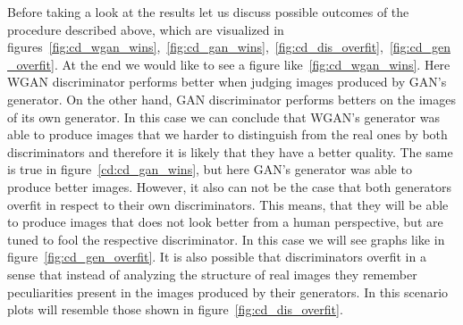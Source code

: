 Before taking a look at the results let us discuss possible outcomes of the procedure described above, which are visualized in figures~\ref{fig:cd_wgan_wins},~\ref{fig:cd_gan_wins},~\ref{fig:cd_dis_overfit},~\ref{fig:cd_gen_overfit}. At the end we would like to see a figure like~\ref{fig:cd_wgan_wins}. Here WGAN discriminator performs better when judging images produced by GAN's generator. On the other hand, GAN discriminator performs betters on the images of its own generator. In this case we can conclude that WGAN's generator was able to produce images that we harder to distinguish from the real ones by both discriminators and therefore it is likely that they have a better quality. The same is true in figure~\ref{cd:cd_gan_wins}, but here GAN's generator was able to produce better images. However, it also can not be the case that both generators overfit in respect to their own discriminators. This means, that they will be able to produce images that does not look better from a human perspective, but are tuned to fool the respective discriminator. In this case we will see graphs like in figure~\ref{fig:cd_gen_overfit}. It is also possible that discriminators overfit in a sense that instead of analyzing the structure of real images they remember peculiarities present in the images produced by their generators. In this scenario plots will resemble those shown in figure~\ref{fig:cd_dis_overfit}.

